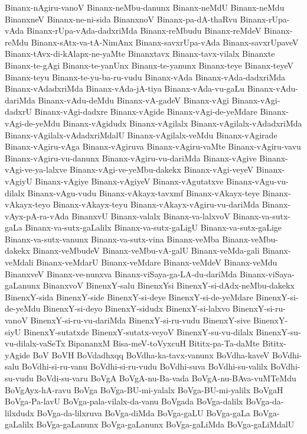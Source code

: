 {Binanx-nAgiru-vanoV
Binanx-neMbu-danunx
Binanx-neMdU
Binanx-neMdu
BinanxneV
Binanx-ne-ni-sida
BinanxnoV
Binanx-pa-dA-thaRvu
Binanx-rUpa-vAda
Binanx-rUpa-vAda-dadxriMda
Binanx-reMbudu
Binanx-reMdeV
Binanx-reMdu
Binanx-sAtx-va-tA-NimAnx
Binanx-savxrUpa-vAda
Binanx-savxrUpaveV
Binanx-tAvx-di-kAlapx-ne-yaMte
Binanxtavx
Binanx-tavx-vilalx
Binanxte
Binanx-te-gAgi
Binanx-te-yanUnx
Binanx-te-yanunx
Binanx-teye
Binanx-teyeV
Binanx-teyu
Binanx-te-yu-ba-ru-vudu
Binanx-vAda
Binanx-vAda-dadxriMda
Binanx-vAdadxriMda
Binanx-vAda-jA-tiya
Binanx-vAda-vu-gaLu
Binanx-vAdu-dariMda
Binanx-vAdu-deMdu
Binanx-vA-gadeV
Binanx-vAgi
Binanx-vAgi-dadxrU
Binanx-vAgi-dadxre
Binanx-vAgide
Binanx-vAgi-de-yeMdare
Binanx-vAgi-de-yeMdu
Binanx-vAgidudx
Binanx-vAgilalx
Binanx-vAgilalx-vAdadxriMda
Binanx-vAgilalx-vAdadxriMdalU
Binanx-vAgilalx-veMdu
Binanx-vAgirade
Binanx-vAgiru-vAga
Binanx-vAgiruva
Binanx-vAgiru-vaMte
Binanx-vAgiru-vavu
Binanx-vAgiru-vu-danunx
Binanx-vAgiru-vu-dariMda
Binanx-vAgive
Binanx-vAgi-ve-ya-lalxve
Binanx-vAgi-ve-yeMbu-dakekx
Binanx-vAgi-veyeV
Binanx-vAgiyU
Binanx-vAgiye
Binanx-vAgiyeV
Binanx-vAgutatxve
Binanx-vAgu-vu-dilalx
Binanx-vAgu-vudu
Binanx-vAkayx-tavxmf
Binanx-vAkayx-teye
Binanx-vAkayx-teyo
Binanx-vAkayx-teyu
Binanx-vAkayx-vAgiru-vu-dariMda
Binanx-vAyx-pA-ra-vAda
BinanxvU
Binanx-valalx
Binanx-va-lalxvoV
Binanx-va-sutx-gaLa
Binanx-va-sutx-gaLalilx
Binanx-va-sutx-gaLigU
Binanx-va-sutx-gaLige
Binanx-va-sutx-vanunx
Binanx-va-sutx-vina
Binanx-veMba
Binanx-veMbu-dakekx
Binanx-veMbudeV
Binanx-veMbu-vA-galU
Binanx-veMda-gali
Binanx-veMdali
Binanx-veMdarU
Binanx-veMdare
Binanx-veMdeV
Binanx-veMdu
BinanxveV
Binanx-ve-nunxva
Binanx-viSaya-ga-LA-du-dariMda
Binanx-viSaya-gaLanunx
BinanxvoV
BinenxY-salu
BinenxYsi
BinenxY-si-dAdx-neMbu-dakekx
BinenxY-sida
BinenxY-side
BinenxY-si-deye
BinenxY-si-de-yeMdare
BinenxY-si-de-yeMdu
BinenxY-si-deyo
BinenxY-sidudx
BinenxY-si-lalxvo
BinenxY-si-ru-vanoV
BinenxY-si-ru-vu-dariMda
BinenxY-si-ru-vudu
BinenxY-sive
BinenxY-siyU
BinenxY-sutatxde
BinenxY-sutatx-veyoV
BinenxY-su-vu-dilalx
BinenxY-su-vu-dilalx-vaSeTx
BipananxM
Bisa-meV-toVyxcuH
Bititx-pa-Ta-daMte
Bititx-yAgide
BoV
BoVH
BoVdadhxqq
BoVdha-ka-tavx-vanunx
BoVdha-kaveV
BoVdhi-salu
BoVdhi-si-ru-vanu
BoVdhi-si-ru-vudu
BoVdhi-suva
BoVdhi-su-valilx
BoVdhi-su-vudu
BoVdi-su-varu
BoVgA
BoVgA-nu-Ba-vada
BoVgA-nu-BAva-vuMTeMdu
BoVgAyx-hA-ravu
BoVga
BoVga-BU-mi-yalalx
BoVga-BU-mi-yalilx
BoVgaH
BoVga-Pa-lavU
BoVga-pala-vilalx-da-vanu
BoVgada
BoVga-dalilx
BoVga-da-lilxdudx
BoVga-da-lilxruva
BoVga-diMda
BoVga-gaLU
BoVga-gaLa
BoVga-gaLalilx
BoVga-gaLanunx
BoVga-gaLanunx
BoVga-gaLiMda
BoVga-gaLiMdalU
}
